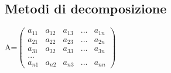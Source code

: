 \documentclass{article} %
\begin{document}
\begin{center}
    \subsection*{Metodi di decomposizione}

    A=\(\begin{pmatrix}
        a_{11} & a_{12} & a_{13} & ... & a_{1n}\\
        a_{21} & a_{22} & a_{23} & ... & a_{2n}\\
        a_{31} & a_{32} & a_{33} & ... & a_{3n}\\
        ...\\
        a_{n1} & a_{n2} & a_{n3} & ... & a_{nn}
    \end{pmatrix}\)



\end{center}
\end{document}
